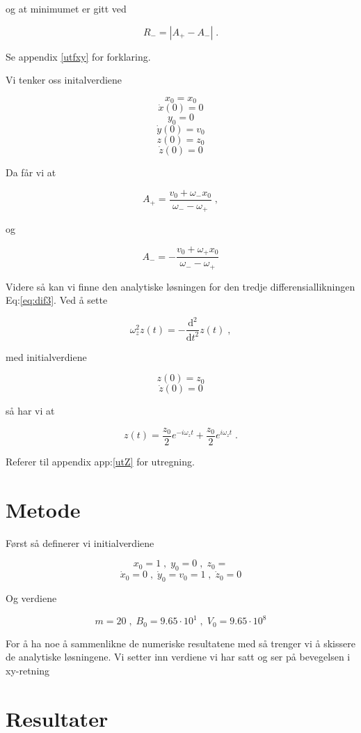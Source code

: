 \documentclass[reprint,english,notitlepage, nofootinbib]{revtex4-1}  %
\begin{document}
og at minimumet er gitt ved

\begin{equation}\label{fmin}
R_- = \left | A_+ - A_- \right | \; .
\end{equation}

Se appendix \ref{utfxy} for forklaring. 

Vi tenker oss initalverdiene

$$x_0 = x_0$$
$$\dot{x}(0) = 0$$
$$y_0 = 0$$
$$\dot{y}(0) = v_0$$
$$z(0) = z_0$$
$$\dot{z}(0) = 0$$

Da får vi at

\begin{equation}
\label{Aplus}
A_+ = \frac{v_0+\omega_-x_0}{\omega_--\omega_+} \; ,
\end{equation}

og

\begin{equation}
\label{Amin}
A_- = -\frac{v_0+\omega_+x_0}{\omega_--\omega_+}
\end{equation}

Videre så kan vi finne den analytiske løsningen for den tredje differensiallikningen Eq:\ref{eq:dif3}. Ved å sette

$$\omega_z^2z(t) = - \frac{\mathrm{d}^2}{\mathrm{d}t^2}z(t) \; ,$$

med initialverdiene 

$$z(0) = z_0$$
$$\dot{z}(0) = 0$$

så har vi at

$$z(t) = \frac{z_0}{2}e^{-i\omega_zt} + \frac{z_0}{2}e^{i\omega_zt} \; .$$

Referer til appendix app:\ref{utZ} for utregning.

\section{Metode}

Først så definerer vi initialverdiene

$$ x_0 = 1 \; , \; y_0 = 0 \; , \; z_0 = $$
$$ \dot{x}_0 = 0 \; , \; \dot{y}_0 = v_0 = 1 \; , \; \dot{z}_0 = 0$$

Og verdiene

$$ m = 20 \; , \; B_0 = 9.65 \cdot 10^1 \; , \; V_0 = 9.65 \cdot 10^8 $$

For å ha noe å sammenlikne de numeriske resultatene med så trenger vi å skissere de analytiske løsningene. Vi setter inn verdiene vi har satt og ser på bevegelsen i xy-retning 

\section{Resultater}
\end{document}
